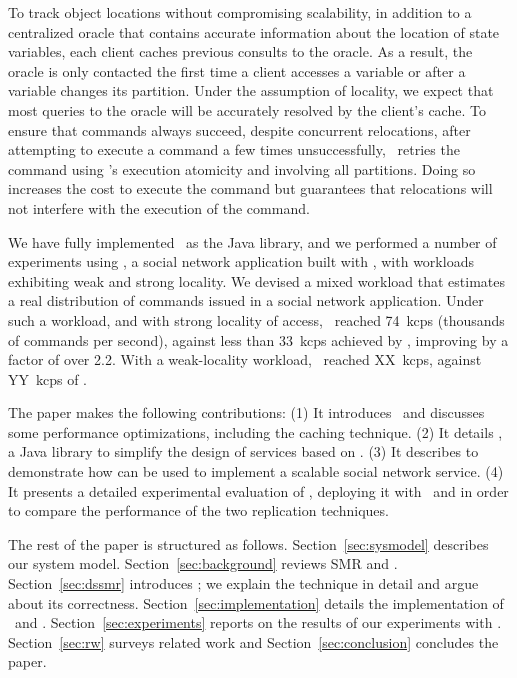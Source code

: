 To track object locations without compromising scalability, in addition to a centralized oracle that contains accurate information about the location of state variables, each client caches previous consults to the oracle.
As a result, the oracle is only contacted the first time a client accesses a variable or after a variable changes its partition.
Under the assumption of locality, we expect that most queries to the oracle will be accurately resolved by the client's cache.
To ensure that commands always succeed, despite concurrent relocations, after attempting to execute a command a few times unsuccessfully, \dssmr\ retries the command using \ssmr{}'s execution atomicity and involving all partitions. 
Doing so increases the cost to execute the command but guarantees that relocations will not interfere with the execution of the command.

We have fully implemented \dssmr\ as the \libname{} Java library, and we performed a number of experiments using \appname{}, a social network application built with \libname{}, with workloads exhibiting weak and strong locality.
We devised a mixed workload that estimates a real distribution of commands issued in a social network application.
Under such a workload, and with strong locality of access, \dssmr\ reached 74~kcps (thousands of commands per second), against less than 33~kcps achieved by \ssmr{}, improving by a factor of over 2.2.
With a weak-locality workload, \dssmr\ reached XX~kcps, against YY~kcps of \ssmr{}.

The paper makes the following contributions:
(1) It introduces \dssmr\ and discusses some performance optimizations, including the caching technique. 
(2) It details \libname{}, a Java library to simplify the design of services based on \dssmr{}.
(3) It describes \appname{} to demonstrate how \libname{} can be used to implement a scalable social network service.
(4) It presents a detailed experimental evaluation of \appname{}, deploying it with \ssmr\ and \dssmr{} in order to compare the performance of the two replication techniques.

The rest of the paper is structured as follows.
Section~\ref{sec:sysmodel} describes our system model.
Section~\ref{sec:background} reviews SMR and \ssmrshort{}.
Section~\ref{sec:dssmr} introduces \dssmr{}; we explain the technique in detail and argue about its correctness.
Section~\ref{sec:implementation} details the implementation of \libname\ and \appname{}.
Section~\ref{sec:experiments} reports on the results of our experiments with \dssmr{}.
Section~\ref{sec:rw} surveys related work and
Section~\ref{sec:conclusion} concludes the paper.





